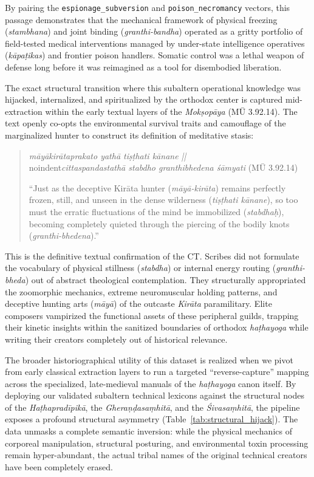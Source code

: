 \documentclass[11pt,twoside,letterpaper]{article}
\begin{document}
By pairing the \texttt{espionage\_subversion} and \texttt{poison\_necromancy} vectors, this passage demonstrates that the mechanical framework of physical freezing (\textit{stambhana}) and joint binding (\textit{granthi-bandha}) operated as a gritty portfolio of field-tested medical interventions managed by under-state intelligence operatives (\textit{kāpaṭikas}) and frontier poison handlers. Somatic control was a lethal weapon of defense long before it was reimagined as a tool for disembodied liberation.

The exact structural transition where this subaltern operational knowledge was hijacked, internalized, and spiritualized by the orthodox center is captured mid-extraction within the early textual layers of the \textit{Mokṣopāya} (MŪ 3.92.14). The text openly co-opts the environmental survival traits and camouflage of the marginalized hunter to construct its definition of meditative stasis:

\begin{quote}
\small
\noindent\textit{māyākirātaprakato yathā tiṣṭhati kānane || } \\noindent\textit{cittaspandastathā stabdho granthibhedena śāmyati} (MŪ 3.92.14)
\medskip

``Just as the deceptive Kirāta hunter (\textit{māyā-kirāta}) remains perfectly frozen, still, and unseen in the dense wilderness (\textit{tiṣṭhati kānane}), so too must the erratic fluctuations of the mind be immobilized (\textit{stabdhaḥ}), becoming completely quieted through the piercing of the bodily knots (\textit{granthi-bhedena}).''
\end{quote}

This is the definitive textual confirmation of the CT. Scribes did not formulate the vocabulary of physical stillness (\textit{stabdha}) or internal energy routing (\textit{granthi-bheda}) out of abstract theological contemplation. They structurally appropriated the zoomorphic mechanics, extreme neuromuscular holding patterns, and deceptive hunting arts (\textit{māyā}) of the outcaste \textit{Kirāta} paramilitary. Elite composers vampirized the functional assets of these peripheral guilds, trapping their kinetic insights within the sanitized boundaries of orthodox \textit{haṭhayoga} while writing their creators completely out of historical relevance.

The broader historiographical utility of this dataset is realized when we pivot from early classical extraction layers to run a targeted ``reverse-capture'' mapping across the specialized, late-medieval manuals of the \textit{haṭhayoga} canon itself. By deploying our validated subaltern technical lexicons against the structural nodes of the \textit{Haṭhapradīpikā}, the \textit{Gheraṇḍasaṃhitā}, and the \textit{Śivasaṃhitā}, the pipeline exposes a profound structural asymmetry (Table~\ref{tab:structural_hijack}). The data unmasks a complete semantic inversion: while the physical mechanics of corporeal manipulation, structural posturing, and environmental toxin processing remain hyper-abundant, the actual tribal names of the original technical creators have been completely erased.
\end{document}
